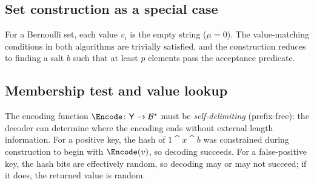 \subsection{Set construction as a special case}

For a Bernoulli set, each value $v_i$ is the empty string ($\mu = 0$).
The value-matching conditions in both algorithms are trivially satisfied,
and the construction reduces to finding a salt $b$ such that at least $p$
elements pass the acceptance predicate.

\subsection{Membership test and value lookup}

\begin{algorithm}[ht]
    \caption{Membership test (\protect\Contains)}
    \label{alg:contains}
    \DontPrintSemicolon
\end{algorithm}

\begin{algorithm}[ht]
    \caption{Value lookup (\protect\Find) for Bernoulli maps}
    \label{alg:find}
    \DontPrintSemicolon
\end{algorithm}

The encoding function $\Encode \colon \Set{Y} \to \cisb$ must be
\emph{self-delimiting} (prefix-free): the decoder can determine where the
encoding ends without external length information.
For a positive key, the hash of $1 \cat x \cat b$ was constrained during
construction to begin with $\Encode(v)$, so decoding succeeds.
For a false-positive key, the hash bits are effectively random, so decoding
may or may not succeed; if it does, the returned value is random.
